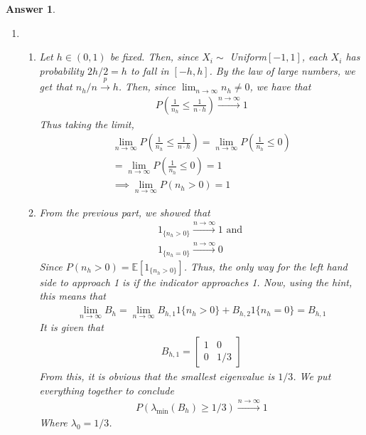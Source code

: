 \documentclass[12pt]{article}
\theoremstyle{colon}
\newtheorem*{answer}{Answer}
\begin{document}
\begin{answer}
\begin{enumerate}[label=\arabic*)]
    \item
      \leavevmode
      \begin{enumerate}[label=\alph*)]
        \item Let $h \in (0,1)$ be fixed. Then, since $X_i \sim$ Uniform$[-1,1]$, each $X_i$ has probability $2h/2 = h$ to fall in $[-h,h]$. By the law of large numbers, we get that $n_h/n \xrightarrow{p} h$. Then, since $\lim_{n \rightarrow \infty} n_h \neq 0$, we have that
        \begin{gather*}
          P \left( \frac{1}{n_h} \leq \frac{1}{n \cdot h} \right) \xrightarrow{n \rightarrow \infty} 1
        \end{gather*}
        Thus taking the limit,
        \begin{gather*}
          \lim_{n \rightarrow \infty} P \left( \frac{1}{n_h} \leq \frac{1}{n \cdot h} \right) = \lim_{n \rightarrow \infty} P \left( \frac{1}{n_h} \leq 0 \right) \\
          = \lim_{n \rightarrow \infty} P \left( \frac{1}{n_h} \leq 0 \right) = 1 \\
          \implies \lim_{n \rightarrow \infty} P \left( n_h > 0 \right) = 1
        \end{gather*}

        \item From the previous part, we showed that
          \begin{gather*}
            1_{\{ n_h > 0 \}} \xrightarrow{n \rightarrow \infty} 1 \text{ and } \\
            1_{\{ n_h = 0 \}} \xrightarrow{n \rightarrow \infty} 0
          \end{gather*}
          Since $P(n_h > 0) = \mathbb{E}[1_{\{ n_h > 0 \}}]$. Thus, the only way for the left hand side to approach 1 is if the indicator approaches 1. Now, using the hint, this means that
          \begin{gather*}
            \lim_{n \rightarrow \infty} B_h = \lim_{n \rightarrow \infty} B_{h,1} 1\{ n_h > 0\} + B_{h,2} 1\{ n_h = 0 \} = B_{h,1}
          \end{gather*}
          It is given that
          \begin{gather*}
            B_{h,1} = \begin{bmatrix}
            1 & 0 \\
            0 & 1/3
            \end{bmatrix}
          \end{gather*}
          From this, it is obvious that the smallest eigenvalue is $1/3$. We put everything together to conclude
          \begin{gather*}
            P(\lambda_{\min}(B_h) \geq 1/3) \xrightarrow{n \rightarrow \infty} 1
          \end{gather*}
          Where $\lambda_0 = 1/3$.


\end{enumerate}
\end{enumerate}
\end{answer}
\end{document}
